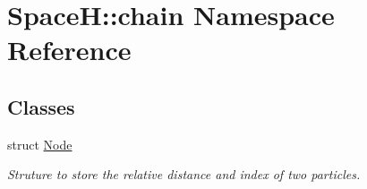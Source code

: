 \hypertarget{namespace_space_h_1_1chain}{}\section{SpaceH\+:\+:chain Namespace Reference}
\label{namespace_space_h_1_1chain}
\subsection*{Classes}
\begin{DoxyCompactItemize}
\item 
struct \mbox{\hyperlink{struct_space_h_1_1chain_1_1_node}{Node}}
\begin{DoxyCompactList}\small\item\em Struture to store the relative distance and index of two particles. \end{DoxyCompactList}\end{DoxyCompactItemize}

